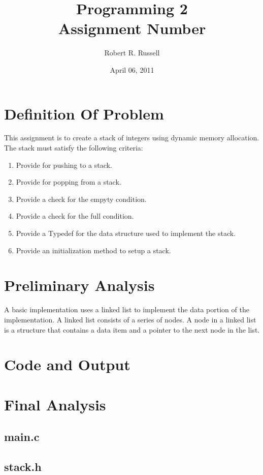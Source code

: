 \documentclass[letterpaper,oneside]{scrartcl}
\title{Programming 2\\Assignment Number}
\author{Robert R. Russell}
\date{April 06, 2011}
\begin{document}
\maketitle

\section{Definition Of Problem}
This assignment is to create a stack of integers using dynamic memory allocation.
The stack must satisfy the following criteria:
\begin{enumerate}
\item Provide for pushing to a stack.
\item Provide for popping from a stack.
\item Provide a check for the empyty condition.
\item Provide a check for the full condition.
\item Provide a Typedef for the data structure used to implement the stack.
\item Provide an initialization method to setup a stack.
\end{enumerate}

\section{Preliminary Analysis}
A basic implementation uses a linked list to implement the data portion of the implementation.
A linked list consists of a series of nodes.
A node in a linked list is a structure that contains a data item and a pointer to the next node in the list.


\section{Code and Output}

\section{Final Analysis}

\subsection{main.c}

\subsection{stack.h}
\end{document}
